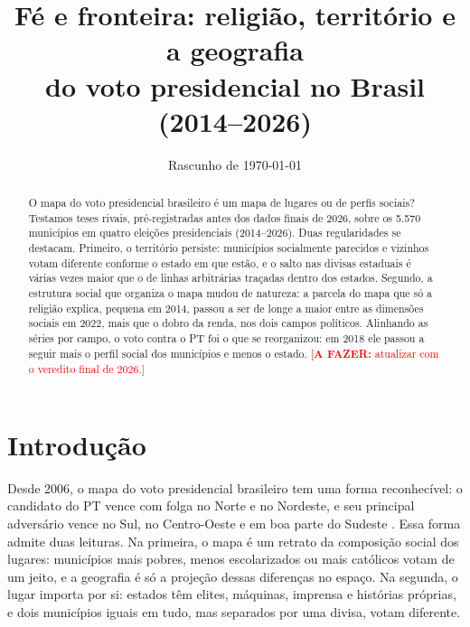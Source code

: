 \documentclass[11pt,a4paper]{article}
\title{Fé e fronteira: religião, território e a geografia\\
       do voto presidencial no Brasil (2014--2026)}
\author{\todo{nome e filiação}}
\date{Rascunho de \today}
\newcommand{\todo}[1]{\textcolor{red}{[\textbf{A FAZER:} #1]}}
\begin{document}
\maketitle

\ifparcial
\begin{center}
\end{center}
\fi

\begin{abstract}
O mapa do voto presidencial brasileiro é um mapa de lugares ou de perfis sociais? Testamos teses
rivais, pré-registradas antes dos dados finais de 2026, sobre os 5.570 municípios em quatro
eleições presidenciais (2014--2026). Duas regularidades se destacam. Primeiro, o território
persiste: municípios socialmente parecidos e vizinhos votam diferente conforme o estado em que estão,
e o salto nas divisas estaduais é várias vezes maior que o de linhas arbitrárias traçadas dentro dos
estados. Segundo, a estrutura social que organiza o mapa mudou de natureza: a parcela do mapa que só a
religião explica, pequena em 2014, passou a ser de longe a maior entre as dimensões sociais em
2022, mais que o dobro da renda, nos dois campos políticos. Alinhando as séries por campo, o voto contra o PT foi o
que se reorganizou: em 2018 ele passou a seguir mais o perfil social dos municípios e menos o estado.
\ifparcial\todo{atualizar com o veredito final de 2026.}\fi
\end{abstract}

\section{Introdução}

Desde 2006, o mapa do voto presidencial brasileiro tem uma forma reconhecível: o candidato do PT
vence com folga no Norte e no Nordeste, e seu principal adversário vence no Sul, no Centro-Oeste e
em boa parte do Sudeste \citep{soares2008,zucco2008,hunter2007}. Essa forma admite duas leituras.
Na primeira, o mapa é um retrato da composição social dos lugares: municípios mais pobres, menos
escolarizados ou mais católicos votam de um jeito, e a geografia é só a projeção dessas diferenças no
espaço. Na segunda, o lugar importa por si: estados têm elites, máquinas, imprensa e histórias
próprias, e dois municípios iguais em tudo, mas separados por uma divisa, votam diferente.
\end{document}
